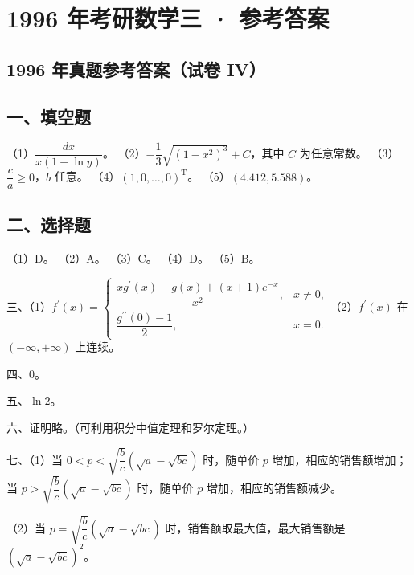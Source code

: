 \documentclass[UTF8,12pt]{ctexart}
\begin{document}
\section*{1996 年考研数学三 · 参考答案}
\subsection*{1996 年真题参考答案（试卷 IV）}

\subsection*{一、填空题}

（1）\(\displaystyle \dfrac{\displaystyle dx}{\displaystyle x(1+\ln y)}\)。 （2）\(\displaystyle -\dfrac{\displaystyle 1}{\displaystyle 3}\sqrt{(1-x^2)^3}+C\)，其中 \(\displaystyle C\) 为任意常数。 （3）\(\displaystyle \dfrac{\displaystyle c}{\displaystyle a}\geq0\)，\(\displaystyle b\) 任意。 （4）\(\displaystyle (1,\allowbreak 0,\allowbreak \ldots,\allowbreak 0)^{\mathrm T}\)。 （5）\(\displaystyle (4.412,\allowbreak 5.588)\)。


\subsection*{二、选择题}

（1）D。 （2）A。 （3）C。 （4）D。 （5）B。


三、（1）\(\displaystyle f^{\prime}(x)=\begin{cases}\dfrac{\displaystyle xg^{\prime}(x)-g(x)+(x+1)e^{-x}}{\displaystyle x^2},\allowbreak &x\ne0,\allowbreak \\\dfrac{\displaystyle g^{\prime\prime}(0)-1}{\displaystyle 2},\allowbreak &x=0.\end{cases}\)（2）\(\displaystyle f^{\prime}(x)\) 在 \(\displaystyle (-\infty,\allowbreak +\infty)\) 上连续。


四、0。


五、\(\displaystyle \ln2\)。


六、证明略。（可利用积分中值定理和罗尔定理。）


七、（1）当 \(\displaystyle 0<p<\sqrt{\dfrac{\displaystyle b}{\displaystyle c}}(\sqrt a-\sqrt{bc})\) 时，随单价 \(\displaystyle p\) 增加，相应的销售额增加；当 \(\displaystyle p>\sqrt{\dfrac{\displaystyle b}{\displaystyle c}}(\sqrt a-\sqrt{bc})\) 时，随单价 \(\displaystyle p\) 增加，相应的销售额减少。


（2）当 \(\displaystyle p=\sqrt{\dfrac{\displaystyle b}{\displaystyle c}}(\sqrt a-\sqrt{bc})\) 时，销售额取最大值，最大销售额是 \(\displaystyle (\sqrt a-\sqrt{bc})^2\)。
\end{document}
